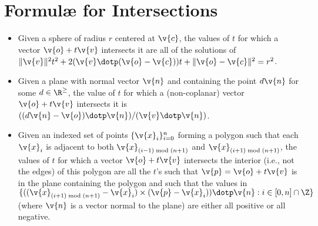 \documentclass{article}
\begin{document}
\section*{Formul\ae{} for Intersections}
\begin{itemize}
\item Given a sphere of radius $r$ centered at $\v{c}$, the values of $t$ for which a vector $\v{o}+t\v{v}$ intersects it are all of the solutions of $\|\v{v}\|^2 t^2 + 2(\v{v}\dotp(\v{o}-\v{c})) t + \|\v{o}-\v{c}\|^2 = r^2$.
\item Given a plane with normal vector $\v{n}$ and containing the point $d\v{n}$ for some $d\in\R^\geq$, the value of $t$ for which a (non-coplanar) vector $\v{o}+t\v{v}$ intersects it is $((d\v{n}-\v{o})\dotp\v{n})/(\v{v}\dotp\v{n})$.
\item Given an indexed set of points $\{\v{x}_i\}_{i=0}^n$ forming a polygon such that each $\v{x}_i$ is adjacent to both $\v{x}_{(i-1)\bmod(n+1)}$ and $\v{x}_{(i+1)\bmod(n+1)}$, the values of $t$ for which a vector $\v{o}+t\v{v}$ intersects the interior (i.e., not the edges) of this polygon are all the $t$'s such that $\v{p} = \v{o}+t\v{v}$ is in the plane containing the polygon and such that the values in $\{((\v{x}_{(i+1)\bmod(n+1)} - \v{x}_i)\times(\v{p} - \v{x}_i))\dotp\v{n} : i\in[0,n]\cap\Z\}$ (where $\v{n}$ is a vector normal to the plane) are either all positive or all negative.  
\end{itemize}
\end{document}
